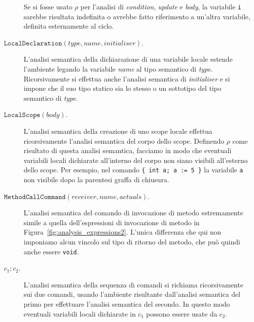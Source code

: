 \begin{description}
  Se si fosse usato $\rho$ per l'analisi di \emph{condition}, \emph{update} e
  \emph{body},
  la variabile \texttt{i} sarebbe risultata indefinita o avrebbe fatto
  riferimento a un'altra variabile, definita esternamente al ciclo.
\item[\underline{$\mathtt{LocalDeclaration(\mathit{type},\mathit{name},\mathit{initialiser})}$}.]
  L'analisi semantica della dichiarazione di una variabile locale estende
  l'ambiente legando la variabile \textit{name} al tipo semantico di
  \textit{type}. Ricorsivamente si effettua anche
  l'analisi semantica di \textit{initialiser} e si impone che il suo tipo
  statico sia lo stesso o un sottotipo del tipo semantico di \textit{type}.
\item[\underline{$\mathtt{LocalScope(\mathit{body})}$}.]
  L'analisi semantica della creazione di uno scope locale effettua
  ricorsivamente l'analisi semantica del corpo dello scope. Definendo
  $\rho$ come risultato di questa analisi semantica, facciamo in modo che
  eventuali variabili locali dichiarate all'interno del corpo
  non siano \piu visibili all'esterno dello scope. Per esempio, nel comando
  \verb!{ int a; a := 5 }! la variabile
  \texttt{a} non \e \piu visibile dopo la parentesi graffa di chiusura.
\item[\underline{$\mathtt{MethodCallCommand(\mathit{receiver},\mathit{name},\mathit{actuals})}$}.]
  L'analisi semantica del comando di invocazione di metodo \e
  estremamente simile a quella dell'espressioni di invocazione di metodo
  in Figura~\ref{fig:analysis_expressions2}. L'unica differenza \e che qui
  non imponiamo alcun vincolo sul tipo di ritorno del metodo, che pu\`o
  quindi anche essere \texttt{void}.
\item[\underline{$c_1;c_2$}.]
  L'analisi semantica della sequenza di comandi si richiama ricorsivamente
  sui due comandi, usando l'ambiente risultante dall'analisi semantica del
  primo per effettuare l'analisi semantica del secondo. In questo modo
  eventuali variabili locali dichiarate in $c_1$ possono essere usate da $c_2$.
\end{description}
%
